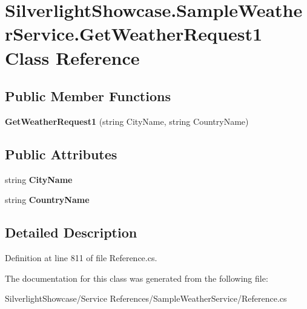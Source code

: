 \hypertarget{class_silverlight_showcase_1_1_sample_weather_service_1_1_get_weather_request1}{
\section{SilverlightShowcase.SampleWeatherService.GetWeatherRequest1 Class Reference}
\label{class_silverlight_showcase_1_1_sample_weather_service_1_1_get_weather_request1}
}
\subsection*{Public Member Functions}
\begin{DoxyCompactItemize}
\item 
\hypertarget{class_silverlight_showcase_1_1_sample_weather_service_1_1_get_weather_request1_afcc6a9d0dd3fe950891e5651bb99acf1}{
{\bfseries GetWeatherRequest1} (string CityName, string CountryName)}
\label{class_silverlight_showcase_1_1_sample_weather_service_1_1_get_weather_request1_afcc6a9d0dd3fe950891e5651bb99acf1}

\end{DoxyCompactItemize}
\subsection*{Public Attributes}
\begin{DoxyCompactItemize}
\item 
\hypertarget{class_silverlight_showcase_1_1_sample_weather_service_1_1_get_weather_request1_a30f656bcbd5b4ccf7f5195e02f4dea04}{
string {\bfseries CityName}}
\label{class_silverlight_showcase_1_1_sample_weather_service_1_1_get_weather_request1_a30f656bcbd5b4ccf7f5195e02f4dea04}

\item 
\hypertarget{class_silverlight_showcase_1_1_sample_weather_service_1_1_get_weather_request1_a8c455ba769ad8b8878a0c72368acef3b}{
string {\bfseries CountryName}}
\label{class_silverlight_showcase_1_1_sample_weather_service_1_1_get_weather_request1_a8c455ba769ad8b8878a0c72368acef3b}

\end{DoxyCompactItemize}


\subsection{Detailed Description}


Definition at line 811 of file Reference.cs.

The documentation for this class was generated from the following file:\begin{DoxyCompactItemize}
\item 
SilverlightShowcase/Service References/SampleWeatherService/Reference.cs\end{DoxyCompactItemize}
